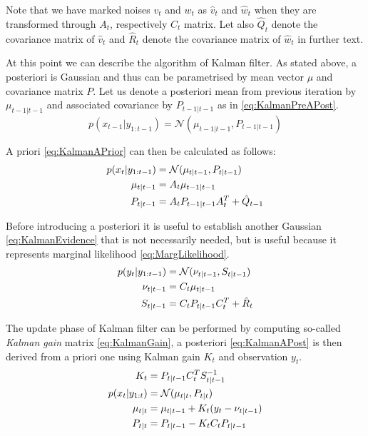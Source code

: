 Note that we have marked noises \(v_t\) and \(w_t\) as \(\hat{v}_t\) and \(\hat{w}_t\) when they
are transformed through \(A_t\), respectively \(C_t\) matrix. Let also \(\hat{Q}_t\) denote the
covariance matrix of \(\hat{v}_t\) and \(\hat{R}_t\) denote the covariance matrix of \(\hat{w}_t\)
in further text.

At this point we can describe the algorithm of Kalman filter. As stated above, a posteriori {\pdf}
is Gaussian and thus can be parametrised by mean vector \(\mu\) and covariance matrix \(P\). Let us
denote a posteriori mean from previous iteration by \(\mu_{t-1|t-1}\) and associated covariance by
\(P_{t-1|t-1}\) as in \eqref{eq:KalmanPreAPost}.
\begin{equation} \label{eq:KalmanPreAPost}
	p(x_{t-1} | y_{1:t-1}) = \mathcal{N}(\mu_{t-1|t-1}, P_{t-1|t-1})
\end{equation}

A priori {\pdf} \eqref{eq:KalmanAPrior} can then be calculated as follows:~\cite{AruMasGor:02}
\begin{align}
	p(x_t | y_{1:t-1}) &= \mathcal{N}(\mu_{t|t-1}, P_{t|t-1}) \label{eq:KalmanAPrior} \\
	\mu_{t|t-1} &= A_t \mu_{t-1|t-1} \notag \\
	P_{t|t-1} &= A_t P_{t-1|t-1} A_t^T + \hat{Q}_{t-1} \notag
\end{align}

Before introducing a posteriori {\pdf} it is useful to establish another Gaussian {\pdf}
\eqref{eq:KalmanEvidence} that is not necessarily needed, but is useful because it represents
marginal likelihood \eqref{eq:MargLikelihood}. %
\begin{align}
	p(y_t|y_{1:t-1}) &= \mathcal{N}(\nu_{t|t-1}, S_{t|t-1}) \label{eq:KalmanEvidence} \\
	\nu_{t|t-1} &= C_t \mu_{t|t-1} \notag \\
	S_{t|t-1} &= C_t P_{t|t-1} C_t^T + \hat{R}_t \notag
\end{align}

The update phase of Kalman filter can be performed by computing so-called \emph{Kalman gain} matrix
\eqref{eq:KalmanGain}, a posteriori {\pdf} \eqref{eq:KalmanAPost} is then derived from a priori one
using Kalman gain \(K_t\) and observation \(y_t\).~\cite{AruMasGor:02}
\begin{align}
	K_t &= P_{t|t-1} C_t^T S_{t|t-1}^{-1} \label{eq:KalmanGain} \\[\parskip]
	p(x_t|y_{1:t}) &= \mathcal{N}(\mu_{t|t}, P_{t|t}) \label{eq:KalmanAPost} \\
	\mu_{t|t} &= \mu_{t|t-1} + K_t(y_t - \nu_{t|t-1}) \notag \\
	P_{t|t} &= P_{t|t-1} - K_t C_t P_{t|t-1} \notag
\end{align}

